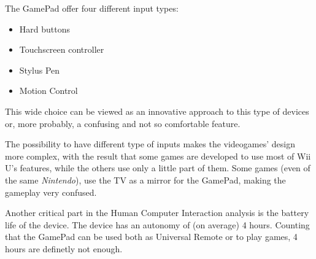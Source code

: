 \documentclass[11pt,a4paper,titlepage]{article}
\begin{document}
			The GamePad offer four different input types:
			\begin{itemize}
				\item Hard buttons
				\item Touchscreen controller
				\item Stylus Pen
				\item Motion Control
			\end{itemize}
			This wide choice can be viewed as an innovative approach to this type of devices or, more probably, a confusing and not so comfortable feature.

			The possibility to have different type of inputs makes the videogames' design more complex, with the result that some games are developed to use most of Wii U's features, while the others use only a little part of them. Some games (even of the same \textit{Nintendo}), use the TV as a mirror for the GamePad, making the gameplay very confused.

			Another critical part in the Human Computer Interaction analysis is the battery life of the device.
			The device has an autonomy of (on average) 4 hours. Counting that the GamePad can be used both as Universal Remote or to play games, 4 hours are definetly not enough.



\end{document}
